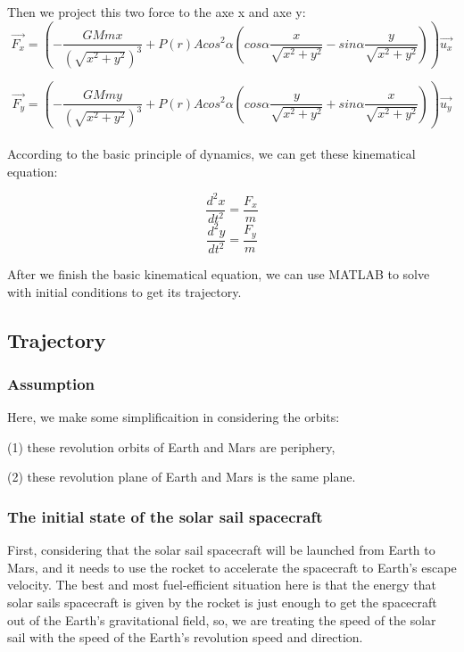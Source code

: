\documentclass[../Paper.tex]{subfiles}
\begin{document}
Then we project this two force to the axe x and axe y:
\begin{equation}
\vec{F_x} = (-\frac{GMmx}{(\sqrt{x^2+y^2})^3} + P(r)Acos^2\alpha(cos\alpha\frac{x}{\sqrt{x^2+y^2}} - sin\alpha\frac{y}{\sqrt{x^2+y^2}}))\vec{u_x}
\end{equation}

\begin{equation}
\vec{F_y} = (-\frac{GMmy}{(\sqrt{x^2+y^2})^3} + P(r)Acos^2\alpha(cos\alpha\frac{y}{\sqrt{x^2+y^2}} + sin\alpha\frac{x}{\sqrt{x^2+y^2}}))\vec{u_y}
\end{equation}
\\

According to the basic principle of dynamics, we can get these kinematical equation:

\begin{equation}
\frac{d^2x}{dt^2} = \frac{F_x}{m}
\end{equation}
\begin{equation}
\frac{d^2y}{dt^2} = \frac{F_y}{m}
\end{equation}

After we finish the basic kinematical equation, we can use MATLAB to solve with initial conditions to get its trajectory.

\subsection{Trajectory}

\subsubsection{Assumption}

Here, we make some simplificaition in considering the orbits: 

(1) these revolution orbits of Earth and Mars are periphery,          

(2) these revolution plane of Earth and Mars is the same plane.   

\subsubsection{The initial state of the solar sail spacecraft}

First, considering that the solar sail spacecraft will be launched from Earth to Mars, and it needs to use the rocket to accelerate the spacecraft to Earth's escape velocity. The best and most fuel-efficient situation here is that the energy that solar sails spacecraft is given by the rocket is just enough to get the spacecraft out of the Earth's gravitational field, so, we are treating the speed of the solar sail with the speed of the Earth's revolution speed  and direction.
\end{document}

